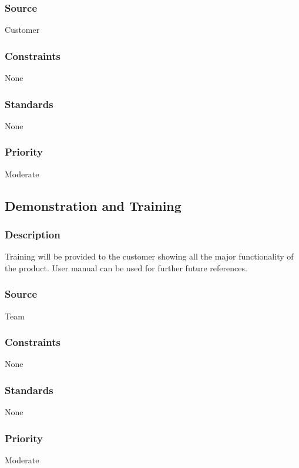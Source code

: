 \subsubsection{Source}
Customer
\subsubsection{Constraints}
None
\subsubsection{Standards}
None
\subsubsection{Priority}
Moderate

\subsection{Demonstration and Training}
\subsubsection{Description}
Training will be provided to the customer showing all the major functionality of the product. User manual can be used for further future references. 
\subsubsection{Source}
Team
\subsubsection{Constraints}
None
\subsubsection{Standards}
None
\subsubsection{Priority}
Moderate

